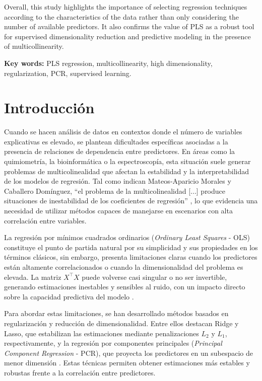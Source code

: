 \documentclass[12pt,a4paper]{report}
\begin{document}
Overall, this study highlights the importance of selecting regression techniques according to the characteristics of the data rather than only considering the number of available predictors. It also confirms the value of PLS as a robust tool for supervised dimensionality reduction and predictive modeling in the presence of multicollinearity.

\vspace{0.5cm}

\textbf{Key words:} PLS regression, multicollinearity, high dimensionality, regularization, PCR, supervised learning.



\fancyhead[L]{\nouppercase{\leftmark}}
\fancyfoot[C]{\thepage}
\chapter{Introducción}
Cuando se hacen análisis de datos en contextos donde el número de variables explicativas es elevado, se plantean dificultades específicas asociadas a la presencia de relaciones de dependencia entre predictores. En áreas como la quimiometría, la bioinformática o la espectroscopía, esta situación suele generar problemas de multicolinealidad que afectan la estabilidad y la interpretabilidad de los modelos de regresión. Tal como indican Mateos‑Aparicio Morales y Caballero Domínguez, “el problema de la multicolinealidad [...] produce situaciones de inestabilidad de los coeficientes de regresión” \cite{mateos2007}, lo que evidencia una necesidad de utilizar métodos capaces de manejarse en escenarios con alta correlación entre variables.

La regresión por mínimos cuadrados ordinarios (\textit{Ordinary Least Squares} - OLS) constituye el punto de partida natural por su simplicidad y sus propiedades en los términos clásicos, sin embargo, presenta limitaciones claras cuando los predictores están altamente correlacionados o cuando la dimensionalidad del problema es elevada. La matriz \(X^\top X\) puede volverse casi singular o no ser invertible, generando estimaciones inestables y sensibles al ruido, con un impacto directo sobre la capacidad predictiva del modelo \cite{hastie2009, samosir2022}.

Para abordar estas limitaciones, se han desarrollado métodos basados en regularización y reducción de dimensionalidad. Entre ellos destacan Ridge y Lasso, que estabilizan las estimaciones mediante penalizaciones $L_2$ y $L_1$, respectivamente, y la regresión por componentes principales (\textit{Principal Component Regression} - PCR), que proyecta los predictores en un subespacio de menor dimensión \cite{hastie2009}. Estas técnicas permiten obtener estimaciones más estables y robustas frente a la correlación entre predictores.
\end{document}
